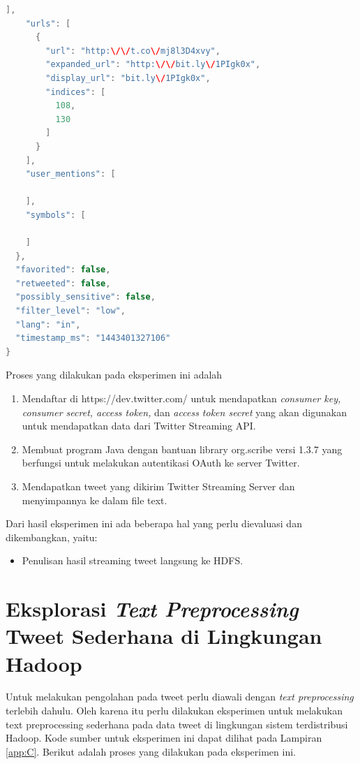 \begin{lstlisting}[language=Java,basicstyle=\tiny,caption=Hasil Streaming]
    ],
    "urls": [
      {
        "url": "http:\/\/t.co\/mj8l3D4xvy",
        "expanded_url": "http:\/\/bit.ly\/1PIgk0x",
        "display_url": "bit.ly\/1PIgk0x",
        "indices": [
          108,
          130
        ]
      }
    ],
    "user_mentions": [
      
    ],
    "symbols": [
      
    ]
  },
  "favorited": false,
  "retweeted": false,
  "possibly_sensitive": false,
  "filter_level": "low",
  "lang": "in",
  "timestamp_ms": "1443401327106"
}
\end{lstlisting}

Proses yang dilakukan pada eksperimen ini adalah
\begin{enumerate}
	\item Mendaftar di https://dev.twitter.com/ untuk mendapatkan \textit{consumer key,  consumer secret, access token,} dan \textit{access token secret} yang akan digunakan untuk mendapatkan data dari Twitter Streaming API.
	\item Membuat program Java dengan bantuan library org.scribe versi 1.3.7 yang berfungsi untuk melakukan autentikasi OAuth ke server Twitter.
	\item Mendapatkan tweet yang dikirim Twitter Streaming Server dan menyimpannya ke dalam file text.
\end{enumerate}
 
Dari hasil eksperimen ini ada beberapa hal yang perlu dievaluasi dan dikembangkan, yaitu:

\begin{itemize}
	\item Penulisan hasil streaming tweet langsung ke HDFS.
\end{itemize}


\section{Eksplorasi \textit{Text Preprocessing} Tweet Sederhana di Lingkungan Hadoop}
Untuk melakukan pengolahan pada tweet perlu diawali dengan \textit{text preprocessing} terlebih dahulu. Oleh karena itu perlu dilakukan eksperimen untuk melakukan text preprocessing sederhana pada data tweet di lingkungan sistem terdistribusi Hadoop. Kode sumber untuk eksperimen ini dapat dilihat pada Lampiran \ref{app:C}. Berikut adalah proses yang dilakukan pada eksperimen ini.


